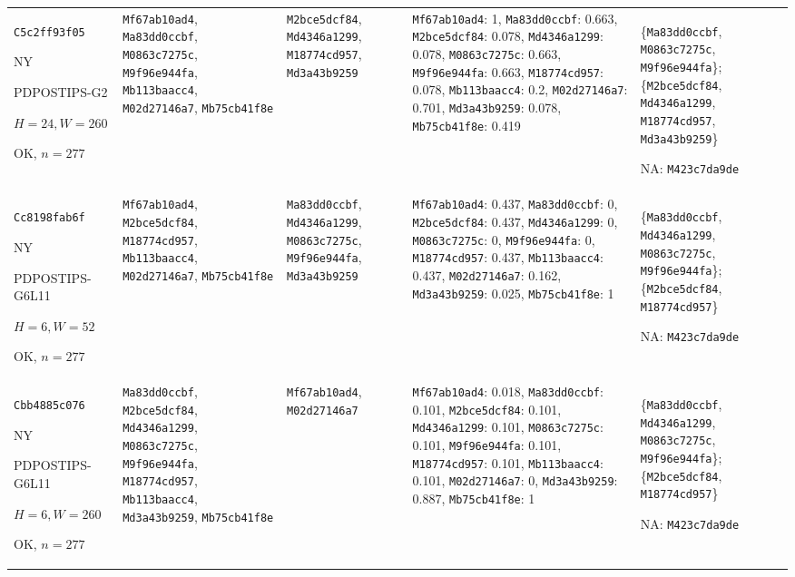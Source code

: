 \begin{longtable}{p{.15\linewidth}p{.17\linewidth}p{.17\linewidth}p{.25\linewidth}p{.14\linewidth}}
\texttt{C5c2ff93f05}\par NY\par PDPOSTIPS-\allowbreak{}G2\par $H=24,W=260$\par OK, $n=277$ & \texttt{Mf67ab10ad4}, \texttt{Ma83dd0ccbf}, \texttt{M0863c7275c}, \texttt{M9f96e944fa}, \texttt{Mb113baacc4}, \texttt{M02d27146a7}, \texttt{Mb75cb41f8e} & \texttt{M2bce5dcf84}, \texttt{Md4346a1299}, \texttt{M18774cd957}, \texttt{Md3a43b9259} & \texttt{Mf67ab10ad4}: 1, \texttt{Ma83dd0ccbf}: 0.663, \texttt{M2bce5dcf84}: 0.078, \texttt{Md4346a1299}: 0.078, \texttt{M0863c7275c}: 0.663, \texttt{M9f96e944fa}: 0.663, \texttt{M18774cd957}: 0.078, \texttt{Mb113baacc4}: 0.2, \texttt{M02d27146a7}: 0.701, \texttt{Md3a43b9259}: 0.078, \texttt{Mb75cb41f8e}: 0.419 & \{\texttt{Ma83dd0ccbf}, \texttt{M0863c7275c}, \texttt{M9f96e944fa}\}; \{\texttt{M2bce5dcf84}, \texttt{Md4346a1299}, \texttt{M18774cd957}, \texttt{Md3a43b9259}\}\par NA: \texttt{M423c7da9de} \\
\texttt{Cc8198fab6f}\par NY\par PDPOSTIPS-\allowbreak{}G6L11\par $H=6,W=52$\par OK, $n=277$ & \texttt{Mf67ab10ad4}, \texttt{M2bce5dcf84}, \texttt{M18774cd957}, \texttt{Mb113baacc4}, \texttt{M02d27146a7}, \texttt{Mb75cb41f8e} & \texttt{Ma83dd0ccbf}, \texttt{Md4346a1299}, \texttt{M0863c7275c}, \texttt{M9f96e944fa}, \texttt{Md3a43b9259} & \texttt{Mf67ab10ad4}: 0.437, \texttt{Ma83dd0ccbf}: 0, \texttt{M2bce5dcf84}: 0.437, \texttt{Md4346a1299}: 0, \texttt{M0863c7275c}: 0, \texttt{M9f96e944fa}: 0, \texttt{M18774cd957}: 0.437, \texttt{Mb113baacc4}: 0.437, \texttt{M02d27146a7}: 0.162, \texttt{Md3a43b9259}: 0.025, \texttt{Mb75cb41f8e}: 1 & \{\texttt{Ma83dd0ccbf}, \texttt{Md4346a1299}, \texttt{M0863c7275c}, \texttt{M9f96e944fa}\}; \{\texttt{M2bce5dcf84}, \texttt{M18774cd957}\}\par NA: \texttt{M423c7da9de} \\
\texttt{Cbb4885c076}\par NY\par PDPOSTIPS-\allowbreak{}G6L11\par $H=6,W=260$\par OK, $n=277$ & \texttt{Ma83dd0ccbf}, \texttt{M2bce5dcf84}, \texttt{Md4346a1299}, \texttt{M0863c7275c}, \texttt{M9f96e944fa}, \texttt{M18774cd957}, \texttt{Mb113baacc4}, \texttt{Md3a43b9259}, \texttt{Mb75cb41f8e} & \texttt{Mf67ab10ad4}, \texttt{M02d27146a7} & \texttt{Mf67ab10ad4}: 0.018, \texttt{Ma83dd0ccbf}: 0.101, \texttt{M2bce5dcf84}: 0.101, \texttt{Md4346a1299}: 0.101, \texttt{M0863c7275c}: 0.101, \texttt{M9f96e944fa}: 0.101, \texttt{M18774cd957}: 0.101, \texttt{Mb113baacc4}: 0.101, \texttt{M02d27146a7}: 0, \texttt{Md3a43b9259}: 0.887, \texttt{Mb75cb41f8e}: 1 & \{\texttt{Ma83dd0ccbf}, \texttt{Md4346a1299}, \texttt{M0863c7275c}, \texttt{M9f96e944fa}\}; \{\texttt{M2bce5dcf84}, \texttt{M18774cd957}\}\par NA: \texttt{M423c7da9de} \\

\end{longtable}
